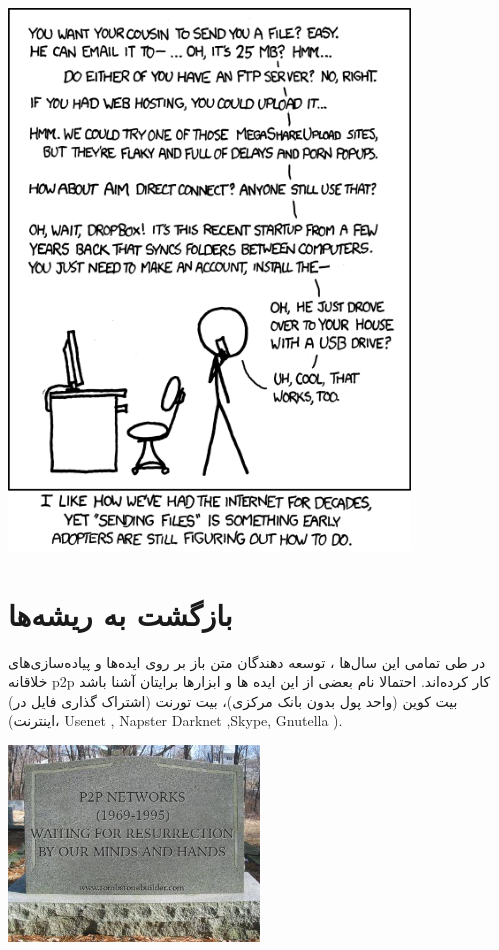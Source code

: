 \documentclass[]{article}
\begin{document}
\includegraphics[width=0.8\textwidth]{images/file_transfer.png}

\section*{{\titr بازگشت به ریشه‌ها}}


در طی تمامی این سال‌ها ، توسعه دهندگان متن باز   بر روی ایده‌ها و پیاده‌سازی‌های خلاقانه p2p کار کرده‌اند. احتمالا نام بعضی از این ایده ها و ابزارها برایتان آشنا باشد (بیت کوین (واحد پول بدون بانک مرکزی)، بیت تورنت (اشتراک گذاری فایل در اینترنت)، Usenet , Napster  Darknet ,Skype, Gnutella ).


\begin{center}
\includegraphics[width=0.5\textwidth]{images/pasted image 1.png}
\end{center}
\end{document}
